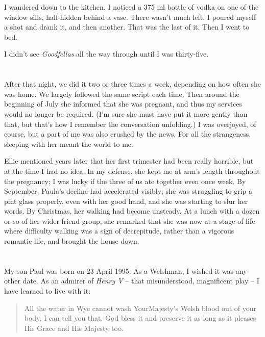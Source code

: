 I wandered down to the kitchen. I noticed a 375 ml bottle of vodka on one of the window sills, half-hidden behind a vase. There wasn't much left. I poured myself a shot and drank it, and then another. That was the last of it. Then I went to bed.

I didn't see \textit{Goodfellas} all the way through until I was thirty-five.

\section{}

After that night, we did it two or three times a week, depending on how often she was home. We largely followed the same script each time. Then around the beginning of July she informed that she was pregnant, and thus my services would no longer be required. (I'm sure she must have put it more gently than that, but that's how I remember the conversation unfolding.) I was overjoyed, of course, but a part of me was also crushed by the news. For all the strangeness, sleeping with her meant the world to me.

Ellie mentioned years later that her first trimester had been really horrible, but at the time I had no idea. In my defense, she kept me at arm's length throughout the pregnancy; I was lucky if the three of us ate together even once week. By September, Paula's decline had accelerated visibly; she was struggling to grip a pint glass properly, even with her good hand, and she was starting to slur her words. By Christmas, her walking had become unsteady. At a lunch with a dozen or so of her wider friend group, she remarked that she was now at a stage of life where difficulty walking was a sign of decrepitude, rather than a vigorous romantic life, and brought the house down.

\section{}

My son Paul was born on 23 April 1995. As a Welshman, I wished it was any other date. As an admirer of \textit{Henry V} -- that misunderstood, magnificent play -- I have learned to live with it:

\begin{quote}
    All the water in Wye cannot wash Your\linebreak Majesty's Welsh blood out of your body, I can tell you that. God bless it and preserve it as long as it pleases His Grace and His Majesty too.
\end{quote}

